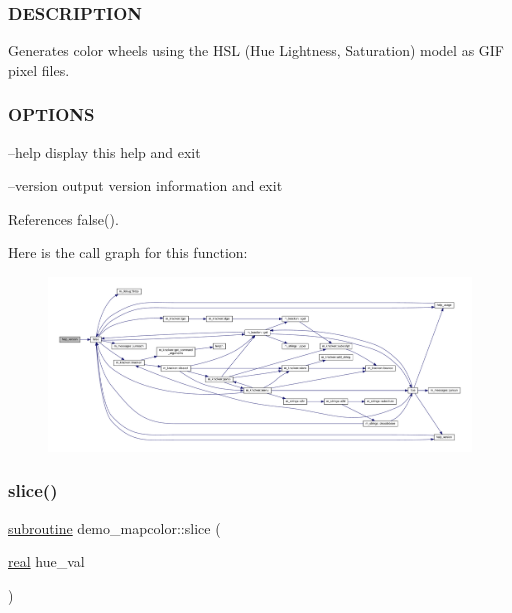 \subsubsection*{D\+E\+S\+C\+R\+I\+P\+T\+I\+ON}

\begin{DoxyVerb} Generates color wheels using the HSL (Hue Lightness, Saturation)
 model as GIF pixel files.
\end{DoxyVerb}


\subsubsection*{O\+P\+T\+I\+O\+NS}

--help display this help and exit

--version output version information and exit 

References false().

Here is the call graph for this function\+:
\nopagebreak
\begin{figure}[H]
\begin{center}
\leavevmode
\includegraphics[width=350pt]{huegif_8f90_a39c21619b08a3c22f19e2306efd7f766_cgraph}
\end{center}
\end{figure}
\mbox{\label{huegif_8f90_a303c71c69a7b51abd347bd12cea7014f}} 
\subsubsection{\texorpdfstring{slice()}{slice()}}
{\footnotesize\ttfamily \hyperlink{M__stopwatch_83_8txt_acfbcff50169d691ff02d4a123ed70482}{subroutine} demo\+\_\+mapcolor\+::slice (\begin{DoxyParamCaption}\item[{\hyperlink{read__watch_83_8txt_abdb62bde002f38ef75f810d3a905a823}{real}}]{hue\+\_\+val }\end{DoxyParamCaption})}




